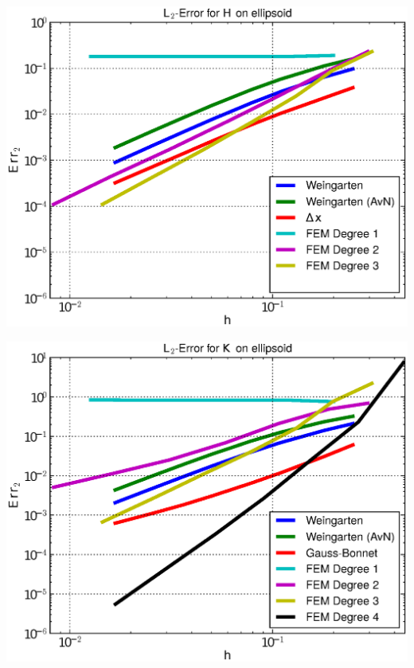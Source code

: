 \documentclass[handout]{beamer}
\begin{document}
\begin{frame}
\begin{overprint}
\begin{minipage}[t]{0.49\textwidth}
            \centering\includegraphics[width=\textwidth]{bilder/Curvature/heineC/ErrHL2_6.eps}
          \end{minipage}
          \begin{minipage}[t]{0.49\textwidth}
            \centering\includegraphics[width=\textwidth]{bilder/Curvature/heineC/ErrKL2_7.eps}
          \end{minipage}\hfill
          \begin{minipage}[t]{0.49\textwidth}

\end{minipage}
\end{overprint}
\end{frame}
\end{document}

